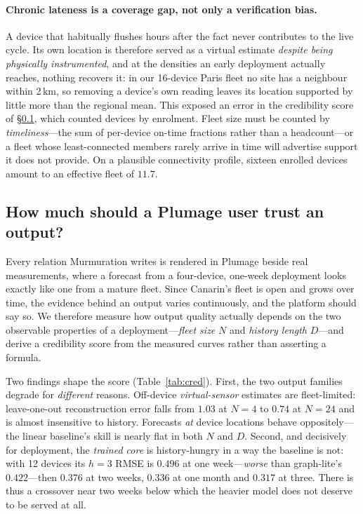 \documentclass[10pt]{article}
\begin{document}
\paragraph{Chronic lateness is a coverage gap, not only a verification bias.}
A device that habitually flushes hours after the fact never contributes to the
live cycle. Its own location is therefore served as a virtual estimate
\emph{despite being physically instrumented}, and at the densities an early
deployment actually reaches, nothing recovers it: in our 16-device Paris fleet no
site has a neighbour within 2\,km, so removing a device's own reading leaves its
location supported by little more than the regional mean. This exposed an error in
the credibility score of \S\ref{sec:credibility}, which counted devices by
enrolment. Fleet size must be counted by \emph{timeliness}---the sum of per-device
on-time fractions rather than a headcount---or a fleet whose least-connected
members rarely arrive in time will advertise support it does not provide. On a
plausible connectivity profile, sixteen enrolled devices amount to an effective
fleet of $11.7$.

\subsection{How much should a Plumage user trust an output?}
\label{sec:credibility}
Every relation Murmuration writes is rendered in Plumage beside real
measurements, where a forecast from a four-device, one-week deployment looks
exactly like one from a mature fleet. Since Canarin's fleet is open and grows
over time, the evidence behind an output varies continuously, and the platform
should say so. We therefore measure how output quality actually depends on the
two observable properties of a deployment---\emph{fleet size} $N$ and
\emph{history length} $D$---and derive a credibility score from the measured
curves rather than asserting a formula.

Two findings shape the score (Table~\ref{tab:cred}). First, the two output
families degrade for \emph{different} reasons. Off-device
\emph{virtual-sensor} estimates are fleet-limited: leave-one-out reconstruction
error falls from $1.03$ at $N=4$ to $0.74$ at $N=24$ and is almost insensitive to
history. Forecasts \emph{at} device locations behave oppositely---the linear
baseline's skill is nearly flat in both $N$ and $D$. Second, and decisively for
deployment, the \emph{trained core} is history-hungry in a way the baseline is
not: with 12 devices its $h{=}3$ RMSE is $0.496$ at one week---\emph{worse} than
graph-lite's $0.422$---then $0.376$ at two weeks, $0.336$ at one month and
$0.317$ at three. There is thus a crossover near two weeks below which the
heavier model does not deserve to be served at all.
\end{document}
